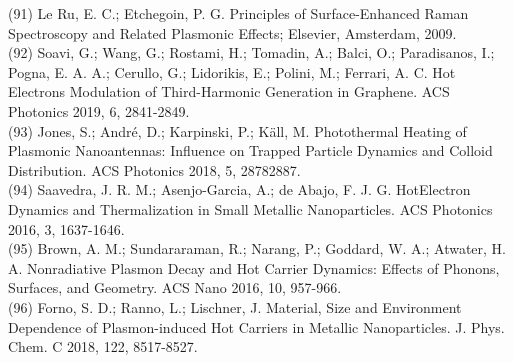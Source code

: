 \documentclass[10pt]{article}
\begin{document}
(91) Le Ru, E. C.; Etchegoin, P. G. Principles of Surface-Enhanced Raman Spectroscopy and Related Plasmonic Effects; Elsevier, Amsterdam, 2009.\\
(92) Soavi, G.; Wang, G.; Rostami, H.; Tomadin, A.; Balci, O.; Paradisanos, I.; Pogna, E. A. A.; Cerullo, G.; Lidorikis, E.; Polini, M.; Ferrari, A. C. Hot Electrons Modulation of Third-Harmonic Generation in Graphene. ACS Photonics 2019, 6, 2841-2849.\\
(93) Jones, S.; André, D.; Karpinski, P.; Käll, M. Photothermal Heating of Plasmonic Nanoantennas: Influence on Trapped Particle Dynamics and Colloid Distribution. ACS Photonics 2018, 5, 28782887.\\
(94) Saavedra, J. R. M.; Asenjo-Garcia, A.; de Abajo, F. J. G. HotElectron Dynamics and Thermalization in Small Metallic Nanoparticles. ACS Photonics 2016, 3, 1637-1646.\\
(95) Brown, A. M.; Sundararaman, R.; Narang, P.; Goddard, W. A.; Atwater, H. A. Nonradiative Plasmon Decay and Hot Carrier Dynamics: Effects of Phonons, Surfaces, and Geometry. ACS Nano 2016, 10, 957-966.\\
(96) Forno, S. D.; Ranno, L.; Lischner, J. Material, Size and Environment Dependence of Plasmon-induced Hot Carriers in Metallic Nanoparticles. J. Phys. Chem. C 2018, 122, 8517-8527.
\end{document}
